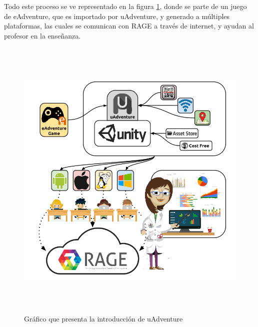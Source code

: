 Todo este proceso se ve representado en la figura \ref{intrograph}, donde se parte de un juego de eAdventure, que es importado por uAdventure, y generado a múltiples plataformas, las cuales se comunican con RAGE a través de internet, y ayudan al profesor en la enseñanza.

\begin{figure}[htb]
	\centerline{\includegraphics[height=5.5in]{figures/uAdventuregrafico.png}}
	\caption[Introducción uAdventure]{Gráfico que presenta la introducción de uAdventure}
	\label{intrograph}
\end{figure}


